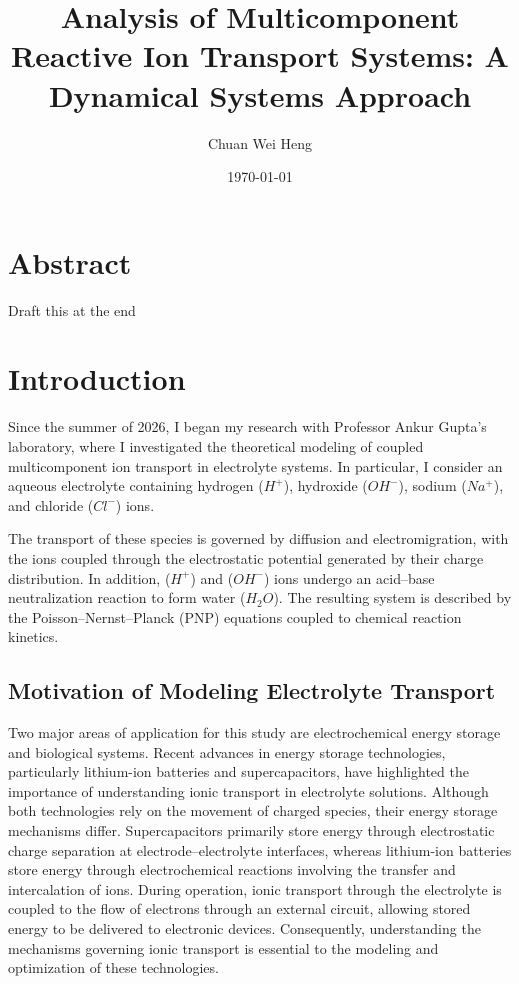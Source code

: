 \documentclass[11pt]{article}
\title{Analysis of Multicomponent Reactive Ion Transport Systems: A Dynamical Systems Approach}
\author{Chuan Wei Heng}
\date{\today}
\begin{document}
\maketitle

\section*{Abstract}
Draft this at the end


\tableofcontents


\section{Introduction}
Since the summer of 2026, I began my research with 
Professor Ankur Gupta’s laboratory, where I investigated the 
theoretical modeling of coupled multicomponent ion transport 
in electrolyte systems. In particular, I consider an aqueous 
electrolyte containing hydrogen ($H^+$), hydroxide ($OH^-$), 
sodium ($Na^+$), and chloride ($Cl^-$) ions.

The transport of these species is governed by diffusion and 
electromigration, with the ions coupled through the 
electrostatic potential generated by their charge 
distribution. In addition, ($H^+$) and ($OH^-$) ions undergo 
an acid–base neutralization reaction to form water ($H_2O$). 
The resulting system is described by the 
Poisson–Nernst–Planck (PNP) equations coupled to chemical 
reaction kinetics.

\subsection{Motivation of Modeling Electrolyte Transport}
Two major areas of application for this study are 
electrochemical energy storage and biological systems. 
Recent advances in energy storage technologies, 
particularly lithium-ion batteries and supercapacitors, have 
highlighted the importance of understanding ionic transport 
in electrolyte solutions. Although both technologies rely on 
the movement of charged species, their energy storage 
mechanisms differ. Supercapacitors primarily store energy 
through electrostatic charge separation at 
electrode–electrolyte interfaces, whereas lithium-ion 
batteries store energy through electrochemical reactions 
involving the transfer and intercalation of ions. During 
operation, ionic transport through the electrolyte is 
coupled to the flow of electrons through an external 
circuit, allowing stored energy to be delivered to 
electronic devices. Consequently, understanding the 
mechanisms governing ionic transport is essential to the 
modeling and optimization of these technologies.
\end{document}
